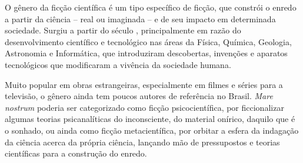 O gênero da ficção científica é um tipo específico de ficção, que constrói o enredo a partir da ciência – real ou imaginada – e de seu impacto em determinada sociedade. Surgiu a partir do século , principalmente em razão do desenvolvimento científico e tecnológico nas áreas da Física, Química, Geologia, Astronomia e Informática, que introduziram descobertas, invenções e aparatos tecnológicos que modificaram a vivência da sociedade humana.

Muito popular em obras estrangeiras, especialmente em filmes e séries para a televisão, o gênero ainda tem poucos autores de referência no Brasil. \emph{Mare nostrum} poderia ser categorizado como ficção psicocientífica, por ficcionalizar algumas teorias psicanalíticas do inconsciente, do material onírico, daquilo que é o sonhado, ou ainda como ficção metacientífica, por orbitar a esfera da indagação da ciência acerca da própria ciência, lançando mão de pressupostos e teorias científicas para a construção do enredo.